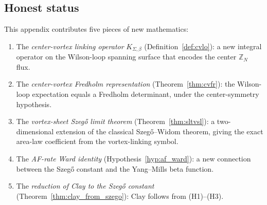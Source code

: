 \subsection{Honest status}
\label{ssec:cvhonest}

\begin{remark}
\label{rem:cv_new}
This appendix contributes five pieces of new mathematics:
\begin{enumerate}
\item The \emph{center-vortex linking operator}
$K_{\Sigma,\beta}$ (Definition~\ref{def:cvlo}): a new integral
operator on the Wilson-loop spanning surface that encodes the
center $\mathbb{Z}_{N}$ flux.
\item The \emph{center-vortex Fredholm representation}
(Theorem~\ref{thm:cvfr}): the Wilson-loop expectation equals a
Fredholm determinant, under the center-symmetry hypothesis.
\item The \emph{vortex-sheet Szeg\H{o} limit theorem}
(Theorem~\ref{thm:sltvsl}): a two-dimensional extension of the
classical Szeg\H{o}--Widom theorem, giving the exact area-law
coefficient from the vortex-linking symbol.
\item The \emph{AF-rate Ward identity}
(Hypothesis~\ref{hyp:af_ward}): a new connection between the
Szeg\H{o} constant and the Yang--Mills beta function.
\item The \emph{reduction of Clay to the Szeg\H{o} constant}
(Theorem~\ref{thm:clay_from_szego}): Clay follows from (H1)--(H3).
\end{enumerate}
\end{remark}


